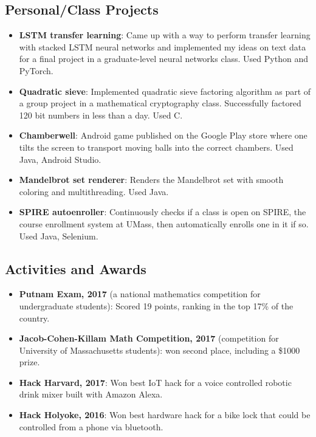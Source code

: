 \documentclass{article}
\begin{document}
	\subsection*{Personal/Class Projects}
    	\begin{itemize}[noitemsep,leftmargin=40pt]
    		\item \textbf{LSTM transfer learning}: Came up with a way to perform transfer learning with stacked LSTM neural networks and implemented my ideas on text data for a final project in a graduate-level neural networks class. Used Python and PyTorch.
        	\item \textbf{Quadratic sieve}: Implemented quadratic sieve factoring algorithm as part of a group project in a mathematical cryptography class. Successfully factored 120 bit numbers in less than a day. Used C.
            \item \textbf{Chamberwell}: Android game published on the Google Play store where one tilts the screen to transport moving balls into the correct chambers. Used Java, Android Studio.
			\item \textbf{Mandelbrot set renderer}: Renders the Mandelbrot set with smooth coloring and multithreading. Used Java.
            \item \textbf{SPIRE autoenroller}: Continuously checks if a class is open on SPIRE, the course enrollment system at UMass, then automatically enrolls one in it if so. Used Java, Selenium.
        \end{itemize}
    \subsection*{Activities and Awards}
    	\begin{itemize}[noitemsep,leftmargin=40pt]
        	\item \textbf{Putnam Exam, 2017} (a national mathematics competition for undergraduate students): Scored 19 points, ranking in the top 17\% of the country.
        	\item \textbf{Jacob-Cohen-Killam Math Competition, 2017} (competition for University of Massachusetts students): won second place, including a \$1000 prize.
            \item \textbf{Hack Harvard, 2017}: Won best IoT hack for a voice controlled robotic drink mixer built with Amazon Alexa.
            \item \textbf{Hack Holyoke, 2016}: Won best hardware hack for a bike lock that could be controlled from a phone via bluetooth.
        \end{itemize}
\end{document}
